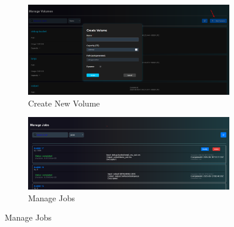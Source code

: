 \begin{figure}[!htbp]
    \begin{subfigure}[b]{0.48\textwidth}
        \includegraphics[width=\textwidth]{Images/kuspace_admin_CreateVolume.png}
        \caption{Create New Volume}
        \label{fig:admincreatevolume}
    \end{subfigure}
    \hfill
    \begin{subfigure}[b]{0.48\textwidth}
        \includegraphics[width=\textwidth]{Images/kuspace_admin_ManageJobs.png}
        \caption{Manage Jobs}
        \label{fig:adminmanagejobs}
    \end{subfigure}

    \vspace{1em}


\end{figure}

